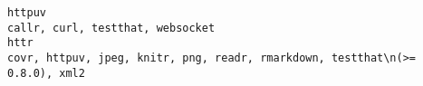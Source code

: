 \documentclass[
  letterpaper,
  DIV=11,
  numbers=noendperiod]{scrreprt}
\begin{document}
\begin{verbatim}
httpuv                                                                                                                                                                                                                                                                                                                                                                                                                                                                                                                                                                                                                                                                                                                                                                                                                                                                                                                                                                                                                                                                                                                                                                                                                                                                       callr, curl, testthat, websocket
httr                                                                                                                                                                                                                                                                                                                                                                                                                                                                                                                                                                                                                                                                                                                                                                                                                                                                                                                                                                                                                                                                                                                                                                                                                             covr, httpuv, jpeg, knitr, png, readr, rmarkdown, testthat\n(>= 0.8.0), xml2

\end{verbatim}
\end{document}
